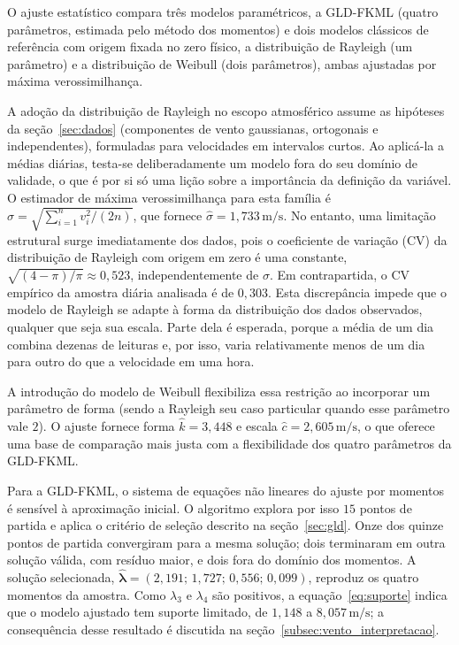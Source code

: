 O ajuste estatístico compara três modelos paramétricos, a GLD-FKML (quatro parâmetros, estimada pelo método dos momentos) e dois modelos clássicos de referência com origem fixada no zero físico, a distribuição de Rayleigh (um parâmetro) e a distribuição de Weibull (dois parâmetros), ambas ajustadas por máxima verossimilhança.

A adoção da distribuição de Rayleigh no escopo atmosférico assume as hipóteses da seção~\ref{sec:dados} (componentes de vento gaussianas, ortogonais e independentes), formuladas para velocidades em intervalos curtos. Ao aplicá-la a médias diárias, testa-se deliberadamente um modelo fora do seu domínio de validade, o que é por si só uma lição sobre a importância da definição da variável. O estimador de máxima verossimilhança para esta família é $\widehat\sigma = \sqrt{\sum_{i=1}^n v_i^2 / (2n)}$, que fornece $\widehat\sigma = 1,733\,\text{m/s}$. No entanto, uma limitação estrutural surge imediatamente dos dados, pois o coeficiente de variação (CV) da distribuição de Rayleigh com origem em zero é uma constante, $\sqrt{(4-\pi)/\pi} \approx 0,523$, independentemente de $\sigma$. Em contrapartida, o CV empírico da amostra diária analisada é de $0,303$. Esta discrepância impede que o modelo de Rayleigh se adapte à forma da distribuição dos dados observados, qualquer que seja sua escala. Parte dela é esperada, porque a média de um dia combina dezenas de leituras e, por isso, varia relativamente menos de um dia para outro do que a velocidade em uma hora.

A introdução do modelo de Weibull flexibiliza essa restrição ao incorporar um parâmetro de forma (sendo a Rayleigh seu caso particular quando esse parâmetro vale $2$). O ajuste fornece forma $\widehat k = 3,448$ e escala $\widehat c = 2,605\,\text{m/s}$, o que oferece uma base de comparação mais justa com a flexibilidade dos quatro parâmetros da GLD-FKML.

Para a GLD-FKML, o sistema de equações não lineares do ajuste por momentos é sensível à aproximação inicial. O algoritmo explora por isso $15$ pontos de partida e aplica o critério de seleção descrito na seção~\ref{sec:gld}. Onze dos quinze pontos de partida convergiram para a mesma solução; dois terminaram em outra solução válida, com resíduo maior, e dois fora do domínio dos momentos. A solução selecionada, $\widehat{\boldsymbol\lambda} = (2,191;\, 1,727;\, 0,556;\, 0,099)$, reproduz os quatro momentos da amostra. Como $\lambda_3$ e $\lambda_4$ são positivos, a equação~\eqref{eq:suporte} indica que o modelo ajustado tem suporte limitado, de $1,148$ a $8,057\,\text{m/s}$; a consequência desse resultado é discutida na seção~\ref{subsec:vento_interpretacao}.

